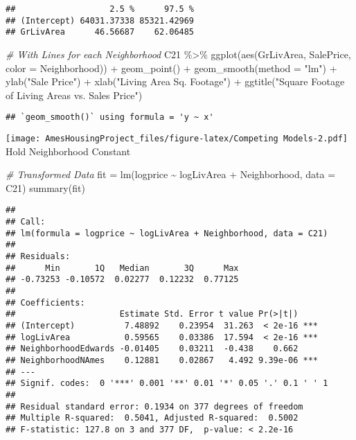 \documentclass[
]{article}
\newenvironment{Shaded}{\begin{snugshade}}{\end{snugshade}}
\newcommand{\AttributeTok}[1]{\textcolor[rgb]{0.77,0.63,0.00}{#1}}
\newcommand{\CommentTok}[1]{\textcolor[rgb]{0.56,0.35,0.01}{\textit{#1}}}
\newcommand{\FunctionTok}[1]{\textcolor[rgb]{0.00,0.00,0.00}{#1}}
\newcommand{\NormalTok}[1]{#1}
\newcommand{\OtherTok}[1]{\textcolor[rgb]{0.56,0.35,0.01}{#1}}
\newcommand{\SpecialCharTok}[1]{\textcolor[rgb]{0.00,0.00,0.00}{#1}}
\newcommand{\StringTok}[1]{\textcolor[rgb]{0.31,0.60,0.02}{#1}}
\begin{document}
\begin{verbatim}
##                   2.5 %      97.5 %
## (Intercept) 64031.37338 85321.42969
## GrLivArea      46.56687    62.06485
\end{verbatim}

\begin{Shaded}
\begin{Highlighting}[]
\CommentTok{\# With Lines for each Neighborhood}
\NormalTok{C21 }\SpecialCharTok{\%\textgreater{}\%} \FunctionTok{ggplot}\NormalTok{(}\FunctionTok{aes}\NormalTok{(GrLivArea, SalePrice, }\AttributeTok{color =}\NormalTok{ Neighborhood)) }\SpecialCharTok{+} 
  \FunctionTok{geom\_point}\NormalTok{() }\SpecialCharTok{+} \FunctionTok{geom\_smooth}\NormalTok{(}\AttributeTok{method =} \StringTok{"lm"}\NormalTok{) }\SpecialCharTok{+}
  \FunctionTok{ylab}\NormalTok{(}\StringTok{"Sale Price"}\NormalTok{) }\SpecialCharTok{+} 
  \FunctionTok{xlab}\NormalTok{(}\StringTok{"Living Area Sq. Footage"}\NormalTok{) }\SpecialCharTok{+} 
  \FunctionTok{ggtitle}\NormalTok{(}\StringTok{"Square Footage of Living Areas vs. Sales Price"}\NormalTok{)}
\end{Highlighting}
\end{Shaded}

\begin{verbatim}
## `geom_smooth()` using formula = 'y ~ x'
\end{verbatim}

\texttt{[image: AmesHousingProject\_files/figure-latex/Competing Models-2.pdf]}
Hold Neighborhood Constant

\begin{Shaded}
\begin{Highlighting}[]
\CommentTok{\# Transformed Data}
\NormalTok{fit }\OtherTok{=} \FunctionTok{lm}\NormalTok{(logprice }\SpecialCharTok{\textasciitilde{}}\NormalTok{ logLivArea }\SpecialCharTok{+}\NormalTok{ Neighborhood, }\AttributeTok{data =}\NormalTok{ C21)}
\FunctionTok{summary}\NormalTok{(fit)}
\end{Highlighting}
\end{Shaded}

\begin{verbatim}
## 
## Call:
## lm(formula = logprice ~ logLivArea + Neighborhood, data = C21)
## 
## Residuals:
##      Min       1Q   Median       3Q      Max 
## -0.73253 -0.10572  0.02277  0.12232  0.77125 
## 
## Coefficients:
##                     Estimate Std. Error t value Pr(>|t|)    
## (Intercept)          7.48892    0.23954  31.263  < 2e-16 ***
## logLivArea           0.59565    0.03386  17.594  < 2e-16 ***
## NeighborhoodEdwards -0.01405    0.03211  -0.438    0.662    
## NeighborhoodNAmes    0.12881    0.02867   4.492 9.39e-06 ***
## ---
## Signif. codes:  0 '***' 0.001 '**' 0.01 '*' 0.05 '.' 0.1 ' ' 1
## 
## Residual standard error: 0.1934 on 377 degrees of freedom
## Multiple R-squared:  0.5041, Adjusted R-squared:  0.5002 
## F-statistic: 127.8 on 3 and 377 DF,  p-value: < 2.2e-16
\end{verbatim}
\end{document}
